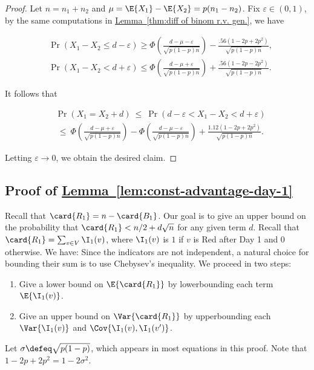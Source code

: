 \documentclass[11pt]{article}
\numberwithin{equation}{section}
\theoremstyle{definition}
\theoremstyle{plain}
\newcommand{\expref}[2]{\hyperref[#2]{#1~\ref{#2}}}
\begin{document}
			\begin{proof}
				Let $n = n_1+n_2$ and $\mu = \E{X_1} - \E{X_2} = p(n_1 - n_2)$. Fix $\varepsilon \in (0, 1)$, by the same computations in \expref{Lemma}{thm:diff of binom r.v. gen.}, we have
				\begin{linenomath}\begin{equation*} \label{eq:temp001}
						\begin{aligned}
							& \Pr\left(X_1 - X_2 \le d - \varepsilon\right) \ge
							\Phi\left(\frac{d - \mu - \varepsilon}{\sqrt{p(1 - p)n}}\right)
							- \frac{.56\left(1 - 2p + 2p^2\right)}{\sqrt{p(1 - p)n}}, \\
							& \Pr\left(X_1 - X_2 < d + \varepsilon\right) \le
							\Phi\left(\frac{d - \mu + \varepsilon}{\sqrt{p(1 - p)n}}\right)
							+ \frac{.56\left(1 - 2p - 2p^2\right)}{\sqrt{p(1 - p)n}}.
						\end{aligned}
				\end{equation*}\end{linenomath}
				It follows that
				\begin{linenomath}\begin{equation*}
						\begin{aligned}
							& \Pr(X_1 = X_2 + d)
							\ \le \ \Pr(d - \varepsilon < X_1 - X_2 < d + \varepsilon)\\
							& \ \le \ \Phi\left(\frac{d - \mu + \varepsilon}{\sqrt{p(1 - p)n}}\right) -
							\Phi\left(\frac{d - \mu - \varepsilon}{\sqrt{p(1 - p)n}}\right) + \frac{1.12\left(1 - 2p + 2p^2\right)}{\sqrt{p(1 - p)n}}.
						\end{aligned}
				\end{equation*}\end{linenomath}
				Letting $\varepsilon \to 0$, we obtain the desired claim.
			\end{proof}
			
			\subsection*{Proof of \expref{Lemma}{lem:const-advantage-day-1}}
			
			Recall that $\card{R_1} = n - \card{B_1}$. Our goal is to 
			give an upper bound on  %
			the probability that $\card{R_1} < n/2 + d\sqrt{n}$ for any given term $d$.
			Recall that $\card{R_1} = \sum_{v\in V}\I_1(v)$, where $\I_1(v) $ is $1$ if $v$ is Red after Day 1 and $0$ otherwise. We have:
			Since the indicators are not independent, a natural choice for bounding their sum is to use Chebysev's inequality. We proceed in two steps:
			\begin{enumerate}
				\item Give a lower bound on $\E{\card{R_1}}$ by lowerbounding  %
				each term $\E{\I_1(v)}$.  
				\item Give an upper bound on $\Var{\card{R_1}}$ by upperbounding %
				each $\Var{\I_1(v)}$ and $\Cov{\I_1(v), \I_1(v')}$.
			\end{enumerate}
			Let $\sigma \defeq \sqrt{p(1 - p)}$, which appears in most equations in this proof.
			Note that $1 - 2p + 2p^2 = 1 - 2\sigma^2$.
			
\end{document}
